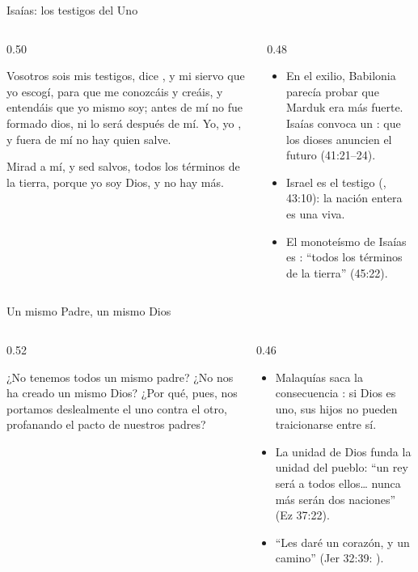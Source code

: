 \begin{frame}{Isaías: los testigos del Uno}
\begin{columns}[t,onlytextwidth]
\begin{column}{0.50\textwidth}
\begin{cita}[fontupper=\scriptsize\itshape]Vosotros sois mis testigos, dice \SENOR, y mi siervo que yo escogí, para que me conozcáis y creáis, y entendáis que yo mismo soy; antes de mí no fue formado dios, ni lo será después de mí. Yo, yo \SENOR, y fuera de mí no hay quien salve.\end{cita}
\begin{cita}[fontupper=\scriptsize\itshape]Mirad a mí, y sed salvos, todos los términos de la tierra, porque yo soy Dios, y no hay más.\end{cita}
\end{column}
\begin{column}{0.48\textwidth}\small
\begin{itemize}
\item En el exilio, Babilonia parecía probar que Marduk era más fuerte. Isaías convoca un : que los dioses anuncien el futuro (41:21--24).
\item Israel es el testigo (, 43:10): la nación entera es una  viva.
\item El monoteísmo de Isaías es : ``todos los términos de la tierra'' (45:22).
\end{itemize}
\end{column}
\end{columns}
\end{frame}

\begin{frame}{Un mismo Padre, un mismo Dios}
\begin{columns}[c,onlytextwidth]
\begin{column}{0.52\textwidth}
\begin{center}\small{}\end{center}
\begin{cita}¿No tenemos todos un mismo padre? ¿No nos ha creado un mismo Dios? ¿Por qué, pues, nos portamos deslealmente el uno contra el otro, profanando el pacto de nuestros padres?\end{cita}
\end{column}
\begin{column}{0.46\textwidth}\small
\begin{itemize}
\item Malaquías saca la consecuencia : si Dios es uno, sus hijos no pueden traicionarse entre sí.
\item La unidad de Dios funda la unidad del pueblo: ``un rey será a todos ellos\ldots{} nunca más serán dos naciones'' (Ez 37:22).
\item ``Les daré un corazón, y un camino'' (Jer 32:39: ).
\end{itemize}
\end{column}
\end{columns}
\end{frame}

